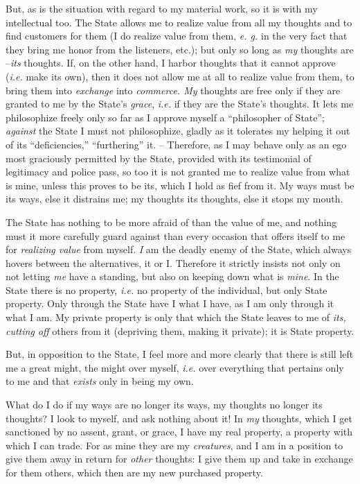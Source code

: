 \documentclass[12pt,a4paper]{book}
\begin{document}
But, as is the situation with regard to my material work, so it is with my 
intellectual too. The State allows me to realize value from all my thoughts 
and to find customers for them (I do realize value from them, \textit{e. g.} 
in the very fact that they bring me honor from the listeners, etc.); but only 
so long as \textit{my} thoughts are --\textit{its} thoughts. If, on the other 
hand, I harbor thoughts that it cannot approve (\textit{i.e.} make its own), 
then it does not allow me at all to realize value from them, to bring them 
into \textit{exchange} into \textit{commerce. My} thoughts are free only if 
they are granted to me by the State's \textit{grace}, \textit{i.e.} if they 
are the State's thoughts. It lets me philosophize freely only so far as I 
approve myself a ``philosopher of State''; \textit{against} the State I must 
not philosophize, gladly as it tolerates my helping it out of its 
``deficiencies,'' ``furthering'' it. -- Therefore, as I may behave only as 
an ego most graciously permitted by the State, provided with its testimonial 
of legitimacy and police pass, so too it is not granted me to realize value 
from what is mine, unless this proves to be its, which I hold as fief from it. 
My ways must be its ways, else it distrains me; my thoughts its thoughts, else 
it stops my mouth.

The State has nothing to be more afraid of than the value of me, and nothing 
must it more carefully guard against than every occasion that offers itself to 
me for \textit{realizing value} from myself. \textit{I} am the deadly enemy of 
the State, which always hovers between the alternatives, it or I. Therefore it 
strictly insists not only on not letting \textit{me} have a standing, but also 
on keeping down what is \textit{mine}. In the State there is no property, 
\textit{i.e.} no property of the individual, but only State property. Only 
through the State have I what I have, as I am only through it what I am. My 
private property is only that which the State leaves to me of \textit{its, 
cutting off} others from it (depriving them, making it private); it is State 
property.

But, in opposition to the State, I feel more and more clearly that there is 
still left me a great might, the might over myself, \textit{i.e.} over 
everything that pertains only to me and that \textit{exists} only in being my 
own.

What do I do if my ways are no longer its ways, my thoughts no longer its 
thoughts? I look to myself, and ask nothing about it! In \textit{my} thoughts, 
which I get sanctioned by no assent, grant, or grace, I have my real property, 
a property with which I can trade. For as mine they are my \textit{creatures}, 
and I am in a position to give them away in return for \textit{other} 
thoughts: I give them up and take in exchange for them others, which then are 
my new purchased property.
\end{document}
